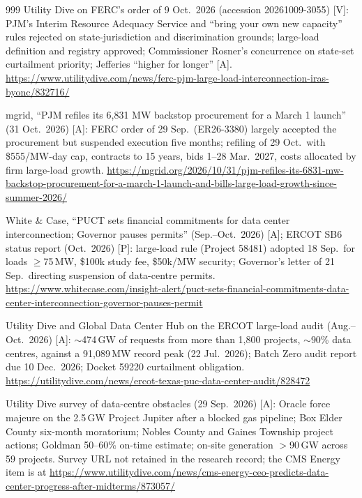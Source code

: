 \begin{thebibliography}{999}
 Utility Dive on FERC's order of 9 Oct.\ 2026 (accession 20261009-3055) [V]: PJM's Interim Resource Adequacy Service and ``bring your own new capacity'' rules rejected on state-jurisdiction and discrimination grounds; large-load definition and registry approved; Commissioner Rosner's concurrence on state-set curtailment priority; Jefferies ``higher for longer'' [A]. \url{https://www.utilitydive.com/news/ferc-pjm-large-load-interconnection-iras-byonc/832716/}

 mgrid, ``PJM refiles its 6,831 MW backstop procurement for a March 1 launch'' (31 Oct.\ 2026) [A]: FERC order of 29 Sep.\ (ER26-3380) largely accepted the procurement but suspended execution five months; refiling of 29 Oct.\ with \$555/MW-day cap, contracts to 15 years, bids 1--28 Mar.\ 2027, costs allocated by firm large-load growth. \url{https://mgrid.org/2026/10/31/pjm-refiles-its-6831-mw-backstop-procurement-for-a-march-1-launch-and-bills-large-load-growth-since-summer-2026/}

 White \& Case, ``PUCT sets financial commitments for data center interconnection; Governor pauses permits'' (Sep.--Oct.\ 2026) [A]; ERCOT SB6 status report (Oct.\ 2026) [P]: large-load rule (Project 58481) adopted 18 Sep.\ for loads $\ge$75\,MW, \$100k study fee, \$50k/MW security; Governor's letter of 21 Sep.\ directing suspension of data-centre permits. \url{https://www.whitecase.com/insight-alert/puct-sets-financial-commitments-data-center-interconnection-governor-pauses-permit}

 Utility Dive and Global Data Center Hub on the ERCOT large-load audit (Aug.--Oct.\ 2026) [A]: $\sim$474\,GW of requests from more than 1,800 projects, $\sim$90\% data centres, against a 91,089\,MW record peak (22 Jul.\ 2026); Batch Zero audit report due 10 Dec.\ 2026; Docket 59220 curtailment obligation. \url{https://utilitydive.com/news/ercot-texas-puc-data-center-audit/828472}

 Utility Dive survey of data-centre obstacles (29 Sep.\ 2026) [A]: Oracle force majeure on the 2.5\,GW Project Jupiter after a blocked gas pipeline; Box Elder County six-month moratorium; Nobles County and Gaines Township project actions; Goldman 50--60\% on-time estimate; on-site generation $>$90\,GW across 59 projects. Survey URL not retained in the research record; the CMS Energy item is at \url{https://www.utilitydive.com/news/cms-energy-ceo-predicts-data-center-progress-after-midterms/873057/}


\end{thebibliography}
